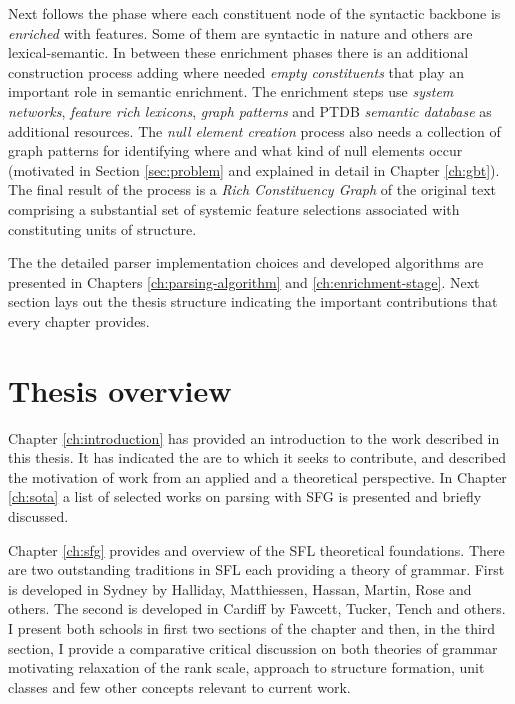 Next follows the phase where each constituent node of the syntactic backbone is \textit{enriched} with features. Some of them are syntactic in nature and others are lexical-semantic. In between these enrichment phases there is an additional construction process adding where needed \textit{empty constituents} that play an important role in semantic enrichment. The enrichment steps use \textit{system networks}, \textit{feature rich lexicons}, \textit{graph patterns} and PTDB \textit{semantic database} as additional resources. The \textit{null element creation} process also needs a collection of graph patterns for identifying where and what kind of null elements occur (motivated in Section \ref{sec:problem} and explained in detail in Chapter \ref{ch:gbt}). The final result of the process is a \textit{Rich Constituency Graph} of the original text comprising a substantial set of systemic feature selections associated with constituting units of structure. 

The the detailed parser implementation choices and developed algorithms are presented in Chapters \ref{ch:parsing-algorithm} and \ref{ch:enrichment-stage}. Next section lays out the thesis structure indicating the important contributions that every chapter provides.

\section{Thesis overview}
\label{sec:thesis-structure}

Chapter \ref{ch:introduction} has provided an introduction to the work described in this thesis. It has indicated the are to which it seeks to contribute, and described the motivation of work from an applied and a theoretical perspective. In Chapter \ref{ch:sota} a list of selected works on parsing with SFG is presented and briefly discussed. 

Chapter \ref{ch:sfg} provides and overview of the SFL theoretical foundations. There are two outstanding traditions in SFL each providing a theory of grammar. First is developed in Sydney by Halliday, Matthiessen, Hassan, Martin, Rose and others. The second is developed in Cardiff by Fawcett, Tucker, Tench and others. I present both schools in first two sections of the chapter and then, in the third section, I provide a comparative critical discussion on both theories of grammar motivating relaxation of the rank scale, approach to structure formation, unit classes and few other concepts relevant to current work. 

